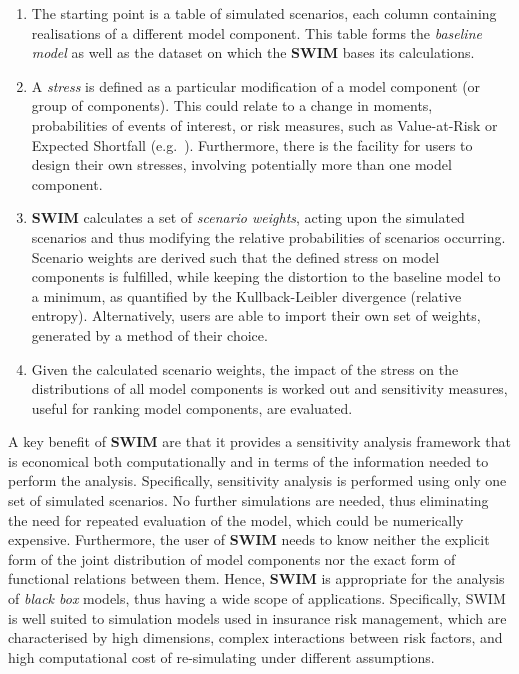 \documentclass[
]{article}
\begin{document}
\begin{enumerate}
\def\labelenumi{\arabic{enumi}.}
\item
  The starting point is a table of simulated scenarios, each column containing realisations of a different model component. This table forms the \emph{baseline model} as well as the dataset on which the \textbf{SWIM} bases its calculations.
\item
  A \emph{stress} is defined as a particular modification of a model component (or group of components). This could relate to a change in moments, probabilities of events of interest, or risk measures, such as Value-at-Risk or Expected Shortfall (e.g.~\citet{Mcneil2015B}). Furthermore, there is the facility for users to design their own stresses, involving potentially more than one model component.
\item
  \textbf{SWIM} calculates a set of \emph{scenario weights}, acting upon the simulated scenarios and thus modifying the relative probabilities of scenarios occurring. Scenario weights are derived such that the defined stress on model components is fulfilled, while keeping the distortion to the baseline model to a minimum, as quantified by the Kullback-Leibler divergence (relative entropy). Alternatively, users are able to import their own set of weights, generated by a method of their choice.
\item
  Given the calculated scenario weights, the impact of the stress on the distributions of all model components is worked out and sensitivity measures, useful for ranking model components, are evaluated.
\end{enumerate}

A key benefit of \textbf{SWIM} are that it provides a sensitivity analysis framework that is economical both computationally and in terms of the information needed to perform the analysis. Specifically, sensitivity analysis is performed using only one set of simulated scenarios. No further simulations are needed, thus eliminating the need for repeated evaluation of the model, which could be numerically expensive. Furthermore, the user of \textbf{SWIM} needs to know neither the explicit form of the joint distribution of model components nor the exact form of functional relations between them. Hence, \textbf{SWIM} is appropriate for the analysis of \emph{black box} models, thus having a wide scope of applications. Specifically, SWIM is well suited to simulation models used in insurance risk management, which are characterised by high dimensions, complex interactions between risk factors, and high computational cost of re-simulating under different assumptions.
\end{document}
